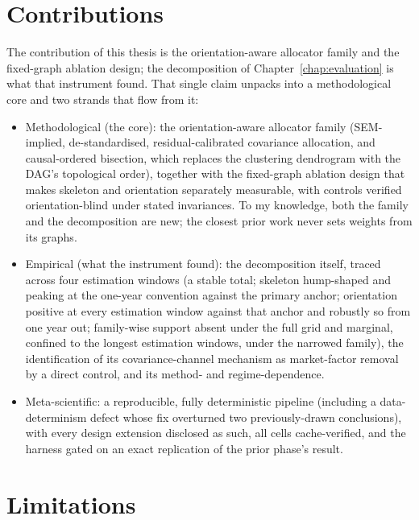 \section{Contributions}
\label{sec:contributions}

The contribution of this thesis is the orientation-aware allocator family
and the fixed-graph ablation design; the decomposition of
Chapter~\ref{chap:evaluation} is what that instrument found. That single
claim unpacks into a methodological core and two strands that flow from
it:

\begin{itemize}[itemsep=2pt]
  \item Methodological (the core): the orientation-aware allocator family
        (SEM-implied, de-standardised, residual-calibrated
        covariance allocation, and causal-ordered bisection, which replaces
        the clustering dendrogram with the DAG's topological order),
        together
        with the fixed-graph ablation design that makes skeleton and
        orientation separately measurable, with controls verified
        orientation-blind under stated invariances. To my knowledge, both the family and the decomposition are
        new; the closest prior work \cite{howard2025causal} never sets
        weights from its graphs.
  \item Empirical (what the instrument found): the decomposition itself, traced across four
        estimation windows (a stable total; skeleton hump-shaped and
        peaking at the one-year convention against the primary anchor;
        orientation positive at every
        estimation window against that anchor and robustly so from one year out;
        family-wise support absent under the full grid and
        marginal, confined to the longest estimation windows, under the narrowed
        family), the identification of its covariance-channel mechanism
        as market-factor removal by a direct control, and its
        method- and
        regime-dependence.
  \item Meta-scientific: a
        reproducible, fully deterministic pipeline (including a
        data-determinism defect
        whose fix overturned two previously-drawn conclusions), with
        every design extension disclosed as such, all cells
        cache-verified, and the
        harness gated on an exact replication of the prior phase's
        result.
\end{itemize}

\section{Limitations}
\label{sec:limitations}

